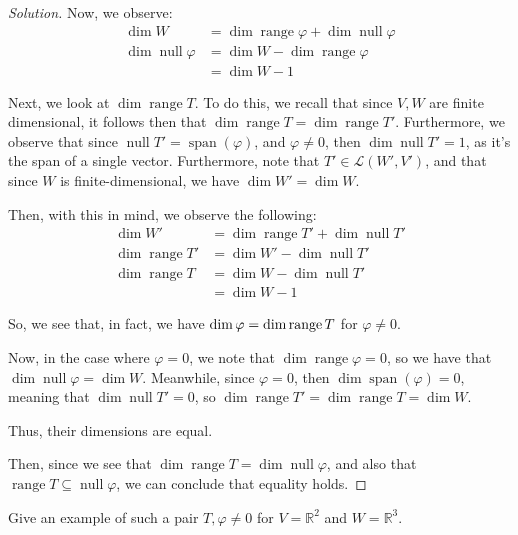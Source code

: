 \documentclass{article}
\newenvironment{solution}{\begin{proof}[Solution]}{\end{proof}}
\newcommand{\RR}{\mathbb{R}}
\DeclareMathOperator*{\vspan}{\mathrm{span}}
\DeclareMathOperator*{\vnull}{\mathrm{null}}
\DeclareMathOperator*{\vrange}{\mathrm{range}}
\begin{document}
\begin{solution}
		Now, we observe:
		\begin{align*}
			\dim W &= \dim \vrange \varphi + \dim \vnull \varphi \\
			\dim \vnull \varphi &= \dim W - \dim\vrange \varphi \\
			&= \dim W - 1
		\end{align*}
	
		Next, we look at $\dim \vrange T$. To do this, we recall that since $V,W$ are finite dimensional, it follows then that $\dim \vrange T = \dim \vrange T'$. Furthermore, we observe that since $\vnull T' = \vspan (\varphi)$, and $\varphi \neq 0$, then $\dim \vnull T' = 1$, as it's the span of a single vector. Furthermore, note that $T' \in \mathcal L(W', V')$, and that since $W$ is finite-dimensional, we have $\dim W' = \dim W$.
		
		Then, with this in mind, we observe the following:
		\begin{align*}
			\dim W' &= \dim \vrange T' + \dim \vnull T' \\
			\dim \vrange T' &= \dim W' - \dim \vnull T' \\
			\dim \vrange T &= \dim W - \dim \vnull T' \\
			&= \dim W - 1
		\end{align*}
	
		So, we see that, in fact, we have $\dim \null \varphi = \dim \vrange T$ for $\varphi \neq 0$.
		
		Now, in the case where $\varphi = 0$, we note that $\dim \vrange \varphi = 0$, so we have that $\dim \vnull \varphi = \dim W$. Meanwhile, since $\varphi = 0$, then $\dim \vspan (\varphi) = 0$, meaning that $\dim \vnull T' = 0$, so $\dim \vrange T' = \dim \vrange T = \dim W$.
		
		Thus, their dimensions are equal.
	
		Then, since we see that $\dim\vrange T = \dim\vnull \varphi$, and also that $\vrange T \subseteq \vnull \varphi$, we can conclude that equality holds.
	\end{solution}
	\begin{hw}
		Give an example of such a pair $T, \varphi \neq 0$ for $V = \RR^{2}$ and $W = \RR^{3}$.
	\end{hw}
\end{document}
